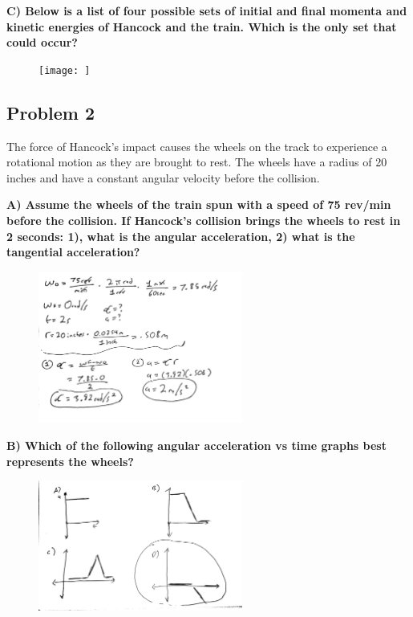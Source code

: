 \documentclass[a4paper,12pt]{article}
\begin{document}
\noindent\textbf{C) Below is a list of four possible sets of initial and final momenta and kinetic energies of Hancock and the train. Which is the only set that could occur? } \\


\begin{figure}[H]
    \centering
    \texttt{[image: ]} %
\end{figure} 


\newpage

\subsection{Problem 2}

The force of Hancock's impact causes the wheels on the track to experience a rotational motion as they are brought to rest. The wheels have a radius of 20 inches and have a constant angular velocity before the collision.

\noindent\textbf{A) Assume the wheels of the train spun with a speed of 75 rev/min before the collision. If Hancock's collision brings the wheels to rest in 2 seconds: 1), what is the angular acceleration, 2) what is the tangential acceleration?} \\


\begin{figure}[H]
    \centering
    \includegraphics[width=0.6\textwidth]{U4_P2_A.jpg} %
\end{figure} 


\noindent\textbf{B) Which of the following angular acceleration vs time graphs best represents the wheels?} \\


\begin{figure}[H]
    \centering
    \includegraphics[width=0.6\textwidth]{U4_P2_B.jpg} %
\end{figure} 
\end{document}
